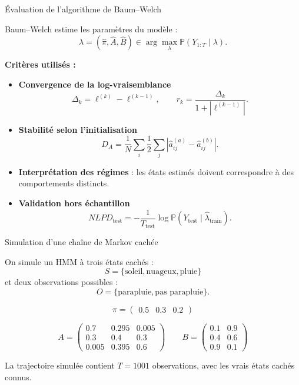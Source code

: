 \documentclass{beamer}
\begin{document}
\begin{frame}{Évaluation de l'algorithme de Baum--Welch}

\small

Baum--Welch estime les paramètres du modèle :
\[
\widehat{\lambda}
=
(\widehat{\pi},\widehat{A},\widehat{B})
\in
\arg\max_{\lambda}
\mathbb{P}(Y_{1:T}\mid \lambda).
\]

\vspace{0.25cm}

\textbf{Critères utilisés :}

\begin{itemize}
    \item \textbf{Convergence de la log-vraisemblance}
    \[
    \Delta_k=\ell^{(k)}-\ell^{(k-1)},
    \qquad
    r_k=
    \frac{\Delta_k}{1+|\ell^{(k-1)}|}.
    \]

    \item \textbf{Stabilité selon l'initialisation}
    \[
    D_A=
    \frac{1}{N}\sum_i
    \frac{1}{2}\sum_j
    |\widehat a_{ij}^{(a)}-\widehat a_{ij}^{(b)}|.
    \]

    \item \textbf{Interprétation des régimes} : les états estimés doivent correspondre à des comportements distincts.

    \item \textbf{Validation hors échantillon}
    \[
    NLPD_{\text{test}}
    =
    -\frac{1}{T_{\text{test}}}
    \log \mathbb{P}(Y_{\text{test}}\mid \widehat{\lambda}_{\text{train}}).
    \]
\end{itemize}

\end{frame}


\begin{frame}{Simulation d'une chaîne de Markov cachée}

\small

On simule un HMM à trois états cachés :
\[
S=\{\text{soleil},\text{nuageux},\text{pluie}\}
\]
et deux observations possibles :
\[
O=\{\text{parapluie},\text{pas parapluie}\}.
\]

\vspace{0.25cm}

\[
\pi=
\begin{pmatrix}
0.5 & 0.3 & 0.2
\end{pmatrix}
\]

\[
A=
\begin{pmatrix}
0.7 & 0.295 & 0.005 \\
0.3 & 0.4 & 0.3 \\
0.005 & 0.395 & 0.6
\end{pmatrix}
\qquad
B=
\begin{pmatrix}
0.1 & 0.9 \\
0.4 & 0.6 \\
0.9 & 0.1
\end{pmatrix}
\]

\vspace{0.2cm}

La trajectoire simulée contient \(T=1001\) observations, avec les vrais états cachés connus.

\end{frame}
\end{document}
